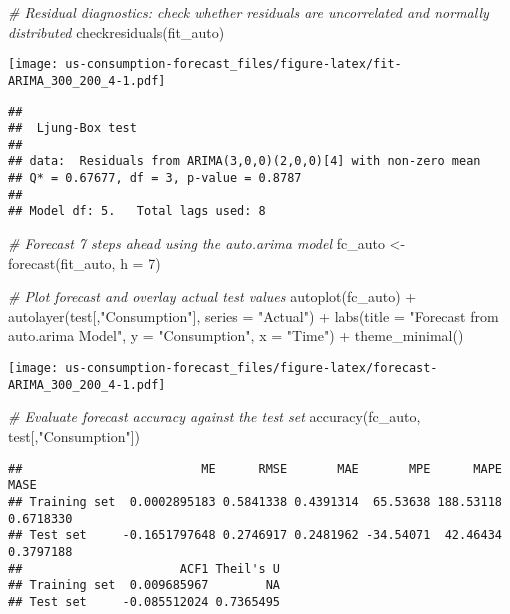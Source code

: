 \documentclass[
  12pt,
]{article}
\newenvironment{Shaded}{\begin{snugshade}}{\end{snugshade}}
\newcommand{\AttributeTok}[1]{\textcolor[rgb]{0.77,0.63,0.00}{#1}}
\newcommand{\CommentTok}[1]{\textcolor[rgb]{0.56,0.35,0.01}{\textit{#1}}}
\newcommand{\DecValTok}[1]{\textcolor[rgb]{0.00,0.00,0.81}{#1}}
\newcommand{\FunctionTok}[1]{\textcolor[rgb]{0.00,0.00,0.00}{#1}}
\newcommand{\NormalTok}[1]{#1}
\newcommand{\OtherTok}[1]{\textcolor[rgb]{0.56,0.35,0.01}{#1}}
\newcommand{\SpecialCharTok}[1]{\textcolor[rgb]{0.00,0.00,0.00}{#1}}
\newcommand{\StringTok}[1]{\textcolor[rgb]{0.31,0.60,0.02}{#1}}
\begin{document}
\begin{Shaded}
\begin{Highlighting}[]
\CommentTok{\# Residual diagnostics: check whether residuals are uncorrelated and normally distributed}
\FunctionTok{checkresiduals}\NormalTok{(fit\_auto)}
\end{Highlighting}
\end{Shaded}

\texttt{[image: us-consumption-forecast\_files/figure-latex/fit-ARIMA\_300\_200\_4-1.pdf]}

\begin{verbatim}
## 
##  Ljung-Box test
## 
## data:  Residuals from ARIMA(3,0,0)(2,0,0)[4] with non-zero mean
## Q* = 0.67677, df = 3, p-value = 0.8787
## 
## Model df: 5.   Total lags used: 8
\end{verbatim}

\begin{Shaded}
\begin{Highlighting}[]
\CommentTok{\# Forecast 7 steps ahead using the auto.arima model}
\NormalTok{fc\_auto }\OtherTok{\textless{}{-}} \FunctionTok{forecast}\NormalTok{(fit\_auto, }\AttributeTok{h =} \DecValTok{7}\NormalTok{)}

\CommentTok{\# Plot forecast and overlay actual test values}
\FunctionTok{autoplot}\NormalTok{(fc\_auto) }\SpecialCharTok{+}
  \FunctionTok{autolayer}\NormalTok{(test[,}\StringTok{"Consumption"}\NormalTok{], }\AttributeTok{series =} \StringTok{"Actual"}\NormalTok{) }\SpecialCharTok{+}
  \FunctionTok{labs}\NormalTok{(}\AttributeTok{title =} \StringTok{"Forecast from auto.arima Model"}\NormalTok{,}
       \AttributeTok{y =} \StringTok{"Consumption"}\NormalTok{, }\AttributeTok{x =} \StringTok{"Time"}\NormalTok{) }\SpecialCharTok{+}
  \FunctionTok{theme\_minimal}\NormalTok{()}
\end{Highlighting}
\end{Shaded}

\texttt{[image: us-consumption-forecast\_files/figure-latex/forecast-ARIMA\_300\_200\_4-1.pdf]}

\begin{Shaded}
\begin{Highlighting}[]
\CommentTok{\# Evaluate forecast accuracy against the test set}
\FunctionTok{accuracy}\NormalTok{(fc\_auto, test[,}\StringTok{"Consumption"}\NormalTok{])}
\end{Highlighting}
\end{Shaded}

\begin{verbatim}
##                         ME      RMSE       MAE       MPE      MAPE      MASE
## Training set  0.0002895183 0.5841338 0.4391314  65.53638 188.53118 0.6718330
## Test set     -0.1651797648 0.2746917 0.2481962 -34.54071  42.46434 0.3797188
##                      ACF1 Theil's U
## Training set  0.009685967        NA
## Test set     -0.085512024 0.7365495
\end{verbatim}
\end{document}
